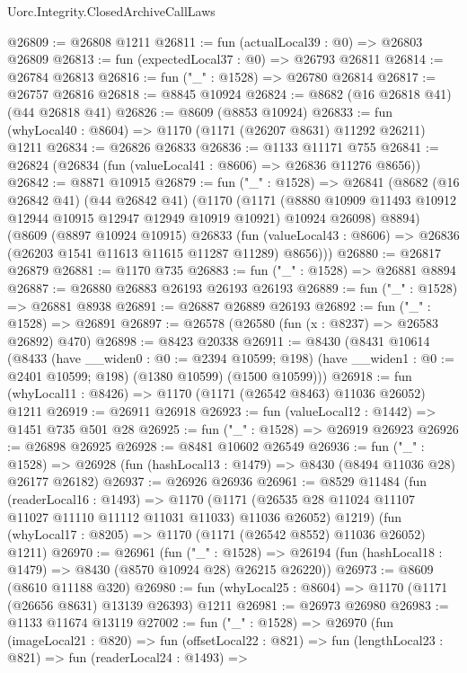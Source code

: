 \begin{lexlean}{Uorc.Integrity.ClosedArchiveCallLaws}
\begin{coremodule}
@26809 := @26808 @1211
@26811 := fun (actualLocal39 : @0) => @26803 @26809
@26813 := fun (expectedLocal37 : @0) => @26793 @26811
@26814 := @26784 @26813
@26816 := fun ("_" : @1528) => @26780 @26814
@26817 := @26757 @26816
@26818 := @8845 @10924
@26824 := @8682 (@16 @26818 @41) (@44 @26818 @41)
@26826 := @8609 (@8853 @10924)
@26833 := fun (whyLocal40 : @8604) => @1170 (@1171 (@26207 @8631) @11292 @26211) @1211
@26834 := @26826 @26833
@26836 := @1133 @11171 @755
@26841 := @26824 (@26834 (fun (valueLocal41 : @8606) => @26836 @11276 @8656))
@26842 := @8871 @10915
@26879 := fun ("_" : @1528) =>
  @26841
    (@8682
      (@16 @26842 @41)
      (@44 @26842 @41)
      (@1170
        (@1171 (@8880 @10909 @11493 @10912 @12944 @10915 @12947 @12949 @10919 @10921) @10924 @26098)
        @8894)
      (@8609
        (@8897 @10924 @10915)
        @26833
        (fun (valueLocal43 : @8606) => @26836 (@26203 @1541 @11613 @11615 @11287 @11289) @8656)))
@26880 := @26817 @26879
@26881 := @1170 @735
@26883 := fun ("_" : @1528) => @26881 @8894
@26887 := @26880 @26883 @26193 @26193 @26193
@26889 := fun ("_" : @1528) => @26881 @8938
@26891 := @26887 @26889 @26193
@26892 := fun ("_" : @1528) => @26891
@26897 := @26578 (@26580 (fun (x : @8237) => @26583 @26892) @470)
@26898 := @8423 @20338
@26911 := @8430
    (@8431
      @10614
      (@8433
        (have __widen0 : @0 := @2394 @10599; @198)
        (have __widen1 : @0 := @2401 @10599; @198)
        (@1380 @10599)
        (@1500 @10599)))
@26918 := fun (whyLocal11 : @8426) => @1170 (@1171 (@26542 @8463) @11036 @26052) @1211
@26919 := @26911 @26918
@26923 := fun (valueLocal12 : @1442) => @1451 @735 @501 @28
@26925 := fun ("_" : @1528) => @26919 @26923
@26926 := @26898 @26925
@26928 := @8481 @10602 @26549
@26936 := fun ("_" : @1528) =>
  @26928 (fun (hashLocal13 : @1479) => @8430 (@8494 @11036 @28) @26177 @26182)
@26937 := @26926 @26936
@26961 := @8529
    @11484
    (fun (readerLocal16 : @1493) =>
    @1170 (@1171 (@26535 @28 @11024 @11107 @11027 @11110 @11112 @11031 @11033) @11036 @26052) @1219)
    (fun (whyLocal17 : @8205) => @1170 (@1171 (@26542 @8552) @11036 @26052) @1211)
@26970 := @26961
    (fun ("_" : @1528) =>
    @26194 (fun (hashLocal18 : @1479) => @8430 (@8570 @10924 @28) @26215 @26220))
@26973 := @8609 (@8610 @11188 @320)
@26980 := fun (whyLocal25 : @8604) => @1170 (@1171 (@26656 @8631) @13139 @26393) @1211
@26981 := @26973 @26980
@26983 := @1133 @11674 @13119
@27002 := fun ("_" : @1528) =>
  @26970
    (fun (imageLocal21 : @820) =>
    fun (offsetLocal22 : @821) =>
    fun (lengthLocal23 : @821) =>
    fun (readerLocal24 : @1493) =>

\end{coremodule}
\end{lexlean}
